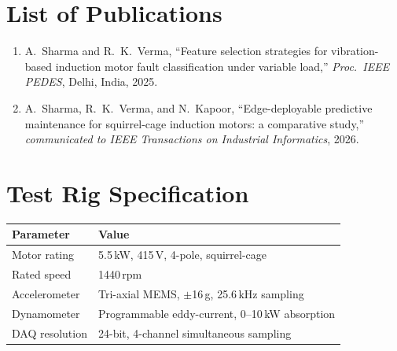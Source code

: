 \documentclass[12pt,a4paper]{report}
\begin{document}
\chapter{List of Publications}
\begin{enumerate}
  \item A.\ Sharma and R.\ K.\ Verma, ``Feature selection strategies for vibration-based
        induction motor fault classification under variable load,'' \emph{Proc.\ IEEE PEDES},
        Delhi, India, 2025.
  \item A.\ Sharma, R.\ K.\ Verma, and N.\ Kapoor, ``Edge-deployable predictive maintenance for
        squirrel-cage induction motors: a comparative study,'' \emph{communicated to IEEE
        Transactions on Industrial Informatics}, 2026.
\end{enumerate}

\chapter{Test Rig Specification}
\begin{tabularx}{\textwidth}{@{}l X@{}}
\toprule
\textbf{Parameter} & \textbf{Value} \\
\midrule
Motor rating & 5.5\,kW, 415\,V, 4-pole, squirrel-cage \\
Rated speed & 1440\,rpm \\
Accelerometer & Tri-axial MEMS, $\pm$16\,g, 25.6\,kHz sampling \\
Dynamometer & Programmable eddy-current, 0--10\,kW absorption \\
DAQ resolution & 24-bit, 4-channel simultaneous sampling \\
\bottomrule
\end{tabularx}
\end{document}

